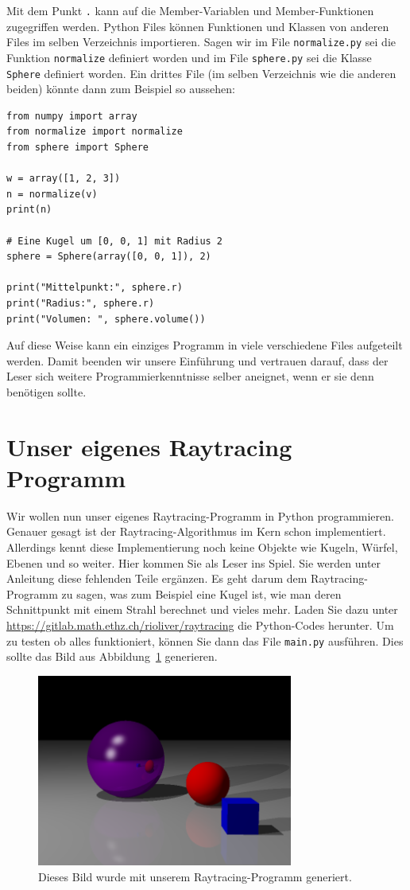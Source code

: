 \documentclass[12pt,a4paper]{article}
\theoremstyle{definition}
\theoremstyle{definition}
\begin{document}
Mit dem Punkt \texttt{.} kann auf die Member-Variablen und Member-Funktionen zugegriffen werden.
Python Files können Funktionen und Klassen von anderen Files im selben Verzeichnis importieren.
Sagen wir im File \texttt{normalize.py} sei die Funktion \texttt{normalize} definiert worden und im File \texttt{sphere.py} sei die Klasse \texttt{Sphere} definiert worden.
Ein drittes File (im selben Verzeichnis wie die anderen beiden) könnte dann zum Beispiel so aussehen:
\begin{lstlisting}[style=python]
from numpy import array
from normalize import normalize
from sphere import Sphere

w = array([1, 2, 3])
n = normalize(v)
print(n)

# Eine Kugel um [0, 0, 1] mit Radius 2
sphere = Sphere(array([0, 0, 1]), 2)

print("Mittelpunkt:", sphere.r)
print("Radius:", sphere.r)
print("Volumen: ", sphere.volume())
\end{lstlisting}
Auf diese Weise kann ein einziges Programm in viele verschiedene Files aufgeteilt werden.
Damit beenden wir unsere Einführung und vertrauen darauf, dass der Leser sich weitere Programmierkenntnisse selber aneignet, wenn er sie denn benötigen sollte.

\section{Unser eigenes Raytracing Programm}
Wir wollen nun unser eigenes Raytracing-Programm in Python programmieren.
Genauer gesagt ist der Raytracing-Algorithmus im Kern schon implementiert.
Allerdings kennt diese Implementierung noch keine Objekte wie Kugeln, Würfel, Ebenen und so weiter.
Hier kommen Sie als Leser ins Spiel.
Sie werden unter Anleitung diese fehlenden Teile ergänzen.
Es geht darum dem Raytracing-Programm zu sagen, was zum Beispiel eine Kugel ist, wie man deren Schnittpunkt mit einem Strahl berechnet und vieles mehr.
Laden Sie dazu unter \url{https://gitlab.math.ethz.ch/rioliver/raytracing} die Python-Codes herunter.
Um zu testen ob alles funktioniert, können Sie dann das File \texttt{main.py} ausführen. Dies sollte das Bild aus Abbildung~\ref{fig:goal} generieren.
\begin{figure}[h!]
	\centering
	\includegraphics[width=0.75\textwidth]{images/outlook.png}
	\caption{Dieses Bild wurde mit unserem Raytracing-Programm generiert.}
	\label{fig:goal}
\end{figure}
\end{document}
